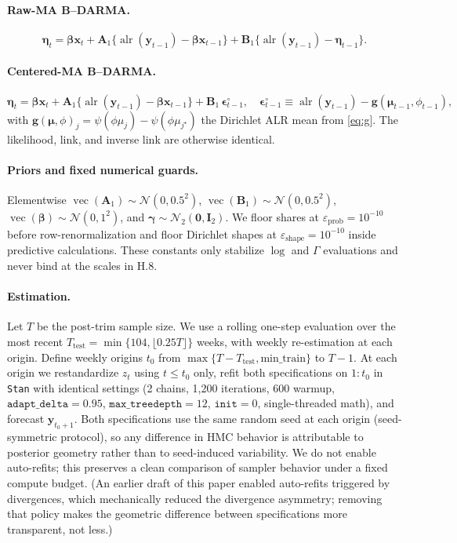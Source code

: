 \documentclass[12pt]{article}
\DeclareMathOperator{\vect}{vec}
\newcommand{\Normal}{\mathcal{N}}
\newcommand{\gfun}[2]{\mathbf{g}\!\left(#1,#2\right)}
\newcommand{\epsprob}{\varepsilon_{\text{prob}}}
\newcommand{\epsshape}{\varepsilon_{\text{shape}}}
\theoremstyle{remark}
\newcommand{\alr}{\operatorname{alr}}
\newcommand{\bfmu}{\boldsymbol{\mu}}
\newcommand{\bfeta}{\boldsymbol{\eta}}
\newcommand{\bfbeta}{\boldsymbol{\beta}}
\newcommand{\bfgamma}{\boldsymbol{\gamma}}
\newcommand{\bfA}{\mathbf{A}}
\newcommand{\bfB}{\mathbf{B}}
\newcommand{\bfI}{\mathbf{I}}
\newcommand{\bfx}{\mathbf{x}}
\newcommand{\bfy}{\mathbf{y}}
\begin{document}
\paragraph{Raw-MA B--DARMA.}
\[
\bfeta_t = \bfbeta\bfx_t + \bfA_1\{\alr(\bfy_{t-1})-\bfbeta\bfx_{t-1}\}+ \bfB_1\{\alr(\bfy_{t-1})-\bfeta_{t-1}\}.
\]

\paragraph{Centered-MA B--DARMA.}
\[
\bfeta_t = \bfbeta\bfx_t + \bfA_1\{\alr(\bfy_{t-1})-\bfbeta\bfx_{t-1}\}+ \bfB_1\,\boldsymbol{\epsilon}_{t-1}^{\circ},\quad
\boldsymbol{\epsilon}_{t-1}^{\circ}\equiv \alr(\bfy_{t-1})-\gfun{\bfmu_{t-1}}{\phi_{t-1}},
\]
with $\gfun{\bfmu}{\phi}_j=\psi(\phi\mu_j)-\psi(\phi\mu_{j^\star})$ the Dirichlet ALR mean from \eqref{eq:g}. The likelihood, link, and inverse link are otherwise identical.

\paragraph{Priors and fixed numerical guards.}
Elementwise $\vect(\bfA_1)\sim\Normal(0,0.5^2)$, $\vect(\bfB_1)\sim\Normal(0,0.5^2)$, $\vect(\bfbeta)\sim\Normal(0,1^2)$, and $\bfgamma\sim\Normal_{2}(\mathbf{0},\bfI_2)$. We floor shares at $\epsprob=10^{-10}$ before row-renormalization and floor Dirichlet shapes at $\epsshape=10^{-10}$ inside predictive calculations. These constants only stabilize $\log$ and $\Gamma$ evaluations and never bind at the scales in H.8.

\paragraph{Estimation.}
Let $T$ be the post-trim sample size. We use a rolling one-step evaluation over the most recent $T_{\text{test}}=\min\{104,\lfloor 0.25T\rfloor\}$ weeks, with weekly re-estimation at each origin. Define weekly origins $t_0$ from $\max\{T-T_{\text{test}},\text{min\_train}\}$ to $T-1$. At each origin we restandardize $z_t$ using $t\le t_0$ only, refit both specifications on $1{:}t_0$ in \texttt{Stan} with identical settings (2 chains, 1{,}200 iterations, 600 warmup, $\texttt{adapt\_delta}=0.95$, $\texttt{max\_treedepth}=12$, $\texttt{init}=0$, single-threaded math), and forecast $\bfy_{t_0+1}$. Both specifications use the same random seed at each origin (seed-symmetric protocol), so any difference in HMC behavior is attributable to posterior geometry rather than to seed-induced variability. We do not enable auto-refits; this preserves a clean comparison of sampler behavior under a fixed compute budget. (An earlier draft of this paper enabled auto-refits triggered by divergences, which mechanically reduced the divergence asymmetry; removing that policy makes the geometric difference between specifications more transparent, not less.)
\end{document}
